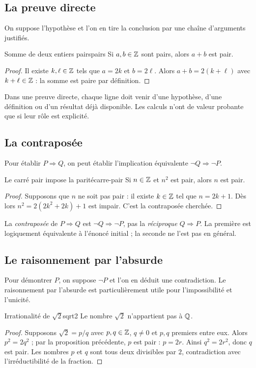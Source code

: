 \subsection{La preuve directe}
On suppose l'hypothèse et l'on en tire la conclusion par une chaîne d'arguments justifiés.
\begin{proposition}{Somme de deux entiers pairs}{pairs}
Si $a,b\in\mathbb Z$ sont pairs, alors $a+b$ est pair.
\end{proposition}
\begin{proof}
Il existe $k,\ell\in\mathbb Z$ tels que $a=2k$ et $b=2\ell$. Alors $a+b=2(k+\ell)$ avec $k+\ell\in\mathbb Z$ : la somme est paire par définition.
\end{proof}
\begin{retenir}
Dans une preuve directe, chaque ligne doit venir d'une hypothèse, d'une définition ou d'un résultat déjà disponible. Les calculs n'ont de valeur probante que si leur rôle est explicité.
\end{retenir}

\subsection{La contraposée}
Pour établir $P\Rightarrow Q$, on peut établir l'implication équivalente $\neg Q\Rightarrow\neg P$.
\begin{proposition}{Le carré pair impose la parité}{carre-pair}
Si $n\in\mathbb Z$ et $n^2$ est pair, alors $n$ est pair.
\end{proposition}
\begin{proof}
Supposons que $n$ ne soit pas pair : il existe $k\in\mathbb Z$ tel que $n=2k+1$. Dès lors $n^2=2(2k^2+2k)+1$ est impair. C'est la contraposée cherchée.
\end{proof}
\begin{attention}
La \emph{contraposée} de $P\Rightarrow Q$ est $\neg Q\Rightarrow\neg P$, pas la \emph{réciproque} $Q\Rightarrow P$. La première est logiquement équivalente à l'énoncé initial ; la seconde ne l'est pas en général.
\end{attention}

\subsection{Le raisonnement par l'absurde}
Pour démontrer $P$, on suppose $\neg P$ et l'on en déduit une contradiction. Le raisonnement par l'absurde est particulièrement utile pour l'impossibilité et l'unicité.
\begin{theoreme}{Irrationalité de $\sqrt2$}{sqrt2}
Le nombre $\sqrt2$ n'appartient pas à $\mathbb Q$.
\end{theoreme}
\begin{proof}
Supposons $\sqrt2=p/q$ avec $p,q\in\mathbb Z$, $q\ne0$ et $p,q$ premiers entre eux. Alors $p^2=2q^2$ ; par la proposition précédente, $p$ est pair : $p=2r$. Ainsi $q^2=2r^2$, donc $q$ est pair. Les nombres $p$ et $q$ sont tous deux divisibles par $2$, contradiction avec l'irréductibilité de la fraction.
\end{proof}

